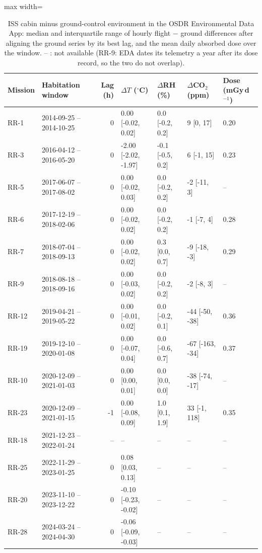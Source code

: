 \begin{table}[htbp]\centering\footnotesize
\caption{ISS cabin minus ground-control environment in the OSDR Environmental Data App: median and interquartile range of hourly flight $-$ ground differences after aligning the ground series by its best lag, and the mean daily absorbed dose over the window. -- : not available (RR-9: EDA dates its telemetry a year after its dose record, so the two do not overlap).}\label{tab:telemetry}
\begin{adjustbox}{max width=\linewidth}
\begin{tabular}{llrllll}
\toprule
Mission & Habitation window & Lag (h) & $\Delta T$ ($^\circ$C) & $\Delta$RH (\%) & $\Delta$CO$_2$ (ppm) & Dose (mGy\,d$^{-1}$) \\
\midrule
RR-1 & 2014-09-25 -- 2014-10-25 & 0 & 0.00 [-0.02, 0.02] & 0.0 [-0.2, 0.2] & 9 [0, 17] & 0.20 \\
RR-3 & 2016-04-12 -- 2016-05-20 & 0 & -2.00 [-2.02, -1.97] & -0.1 [-0.5, 0.2] & 6 [-1, 15] & 0.23 \\
RR-5 & 2017-06-07 -- 2017-08-02 & 0 & 0.00 [-0.02, 0.03] & 0.0 [-0.2, 0.2] & -2 [-11, 3] & -- \\
RR-6 & 2017-12-19 -- 2018-02-06 & 0 & 0.00 [-0.02, 0.02] & 0.0 [-0.2, 0.2] & -1 [-7, 4] & 0.28 \\
RR-7 & 2018-07-04 -- 2018-09-13 & 0 & 0.00 [-0.02, 0.02] & 0.3 [0.0, 0.7] & -9 [-18, -3] & 0.29 \\
RR-9 & 2018-08-18 -- 2018-09-16 & 0 & 0.00 [-0.03, 0.02] & 0.0 [-0.2, 0.2] & -2 [-8, 3] & -- \\
RR-12 & 2019-04-21 -- 2019-05-22 & 0 & 0.00 [-0.01, 0.02] & 0.0 [-0.2, 0.1] & -44 [-50, -38] & 0.36 \\
RR-19 & 2019-12-10 -- 2020-01-08 & 0 & 0.00 [-0.07, 0.04] & 0.0 [-0.6, 0.7] & -67 [-163, -34] & 0.37 \\
RR-10 & 2020-12-09 -- 2021-01-03 & 0 & 0.00 [0.00, 0.01] & 0.0 [0.0, 0.0] & -38 [-74, -17] & -- \\
RR-23 & 2020-12-09 -- 2021-01-15 & -1 & 0.00 [-0.08, 0.09] & 1.0 [0.1, 1.9] & 33 [-1, 118] & 0.35 \\
RR-18 & 2021-12-23 -- 2022-01-24 & -- & -- & -- & -- & -- \\
RR-25 & 2022-11-29 -- 2023-01-25 & 0 & 0.08 [0.03, 0.13] & -- & -- & -- \\
RR-20 & 2023-11-10 -- 2023-12-22 & 0 & -0.10 [-0.23, -0.02] & -- & -- & -- \\
RR-28 & 2024-03-24 -- 2024-04-30 & 0 & -0.06 [-0.09, -0.03] & -- & -- & -- \\
\bottomrule
\end{tabular}
\end{adjustbox}
\end{table}
